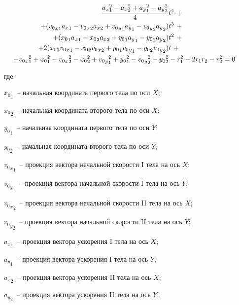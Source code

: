 \documentclass[xetex,aspectratio=43]{beamer}
\newenvironment{Underequation}{
    \small
    \noindent
    где
    \hspace{-1.45ex}
    \setlength{\parindent}{3.5ex}
}{}
\begin{document}
\begin{frame}
    \vspace{-1.5em}
    \begin{align}
        \frac{{a_x}_1^2 - {a_x}_2^2 + {a_y}_1^2 - {a_y}_2^2  }{4}                                                                    & t^4~+  \nonumber                        \\
        + ({{v_0}_x}_1 {a_x}_1 - {{v_0}_x}_2 {a_x}_2 + {{v_0}_y}_1 {a_y}_1 - {{v_0}_y}_2 {a_y}_2)                                    & t^3~+  \nonumber                        \\
        + ({x_0}_1 {a_x}_1 - {x_0}_2 {a_x}_2 + {y_0}_1 {a_y}_1 - {y_0}_2 {a_y}_2)                                                    & t^2~+  \nonumber                        \\
        + 2 ({x_0}_1 {{v_0}_x}_1 - {x_0}_2 {{v_0}_x}_2 + {y_0}_1 {{v_0}_y}_1 - {y_0}_2 {{v_0}_y}_2)                                  & t~+                                     \\
        \hspace{-1em}+ {{v_0}_x}_1^2 + {x_0}_1^2 - {{v_0}_x}_2^2 - {x_0}_2^2 + {{v_0}_y}_1^2 + {y_0}_1^2 - {{v_0}_y}_2^2 - {y_0}_2^2 & - r_1^2 - 2r_1 r_2 - r_2^2 = 0\nonumber
    \end{align}

    {\small
    \begin{Underequation}
        \({x_0}_1\)~-- начальная координата первого тела по оси \(X\);

        \({x_0}_2\)~-- начальная координата второго тела по оси \(X\);

        \({y_0}_1\)~-- начальная координата первого тела по оси \(Y\);

        \({y_0}_2\)~-- начальная координата второго тела по оси \(Y\);

        \({{v_0}_x}_1\)~-- проекция вектора начальной скорости I тела на ось \(X\);

        \({{v_0}_y}_1\)~-- проекция вектора начальной скорости I тела на ось \(Y\);

        \({{v_0}_x}_2\)~-- проекция вектора начальной скорости II тела на ось \(X\);

        \({{v_0}_y}_2\)~-- проекция вектора начальной скорости II тела на ось \(Y\);

        \({a_x}_1\)~-- проекция вектора ускорения I тела на ось \(X\);

        \({a_y}_1\)~-- проекция вектора ускорения I тела на ось \(Y\);

        \({a_x}_2\)~-- проекция вектора ускорения II тела на ось \(X\);

        \({a_y}_2\)~-- проекция вектора ускорения II тела на ось \(Y\).
    \end{Underequation}}
\end{frame}
\end{document}
